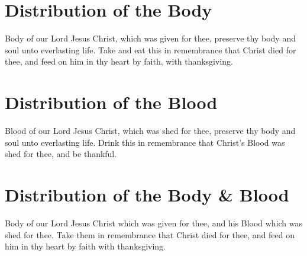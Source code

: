 \section*{Distribution of the Body}
 Body of our Lord Jesus Christ, which was given for thee, preserve thy body and soul unto everlasting life. Take and eat this in remembrance that Christ died for thee, and feed on him in thy heart by faith, with thanksgiving.

\section*{Distribution of the Blood}
 Blood of our Lord Jesus Christ, which was shed for thee, preserve thy body and soul unto everlasting life. Drink this in remembrance that Christ's Blood was shed for thee, and be thankful.

\section*{Distribution of the Body \& Blood}
 Body of our Lord Jesus Christ which was given for thee, and his Blood which was shed for thee. Take them in remembrance that Christ died for thee, and feed on him in thy heart by faith with thanksgiving.